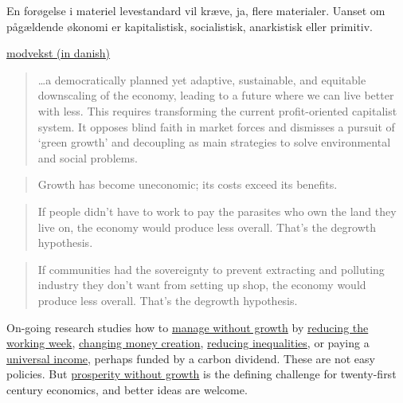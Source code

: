 \documentclass[
]{book}
\begin{document}
En forøgelse i materiel levestandard vil kræve, ja, flere materialer. Uanset om pågældende økonomi er kapitalistisk, socialistisk, anarkistisk eller primitiv.

\href{https://solidaritet.dk/modvaekst-socialisme-uden-vaekst/}{modvekst (in danish)}

\begin{quote}
\ldots a democratically planned yet adaptive, sustainable, and equitable downscaling of the
economy, leading to a future where we can live better with less. This requires transforming the
current profit-oriented capitalist system. It opposes blind faith in market forces and dismisses a
pursuit of `green growth' and decoupling as main strategies to solve environmental and social
problems.
\end{quote}

\begin{quote}
Growth has become uneconomic; its costs exceed its benefits.
\end{quote}

\begin{quote}
If people didn't have to work to pay the parasites who own the land they live on, the economy would produce less overall. That's the degrowth hypothesis.
\end{quote}

\begin{quote}
If communities had the sovereignty to prevent extracting and polluting industry they don't want from
setting up shop, the economy would produce less overall. That's the degrowth hypothesis.
\end{quote}

On-going research studies how to \href{https://www.e-elgar.com/shop/gbp/managing-without-growth-second-edition-9781785367397.html}{manage without growth} by \href{https://www.europeanfinancialreview.com/a-four-day-workweek-a-policy-for-improving-employment-and-environmental-conditions-in-europe/}{reducing the working week}, \href{https://positivemoney.org/publications/escaping-growth-dependency/}{changing money creation}, \href{https://www.tandfonline.com/doi/full/10.1080/09538259.2020.1769293}{reducing inequalities}, or paying a \href{https://greattransition.org/gti-forum/basic-income-standing}{universal income}, perhaps funded by a carbon dividend. These are not easy policies. But \href{https://www.routledge.com/Prosperity-without-Growth-Foundations-for-the-Economy-of-Tomorrow/Jackson/p/book/9781138935419}{prosperity without growth} is the defining challenge for twenty-first century economics, and better ideas are welcome.
\end{document}
